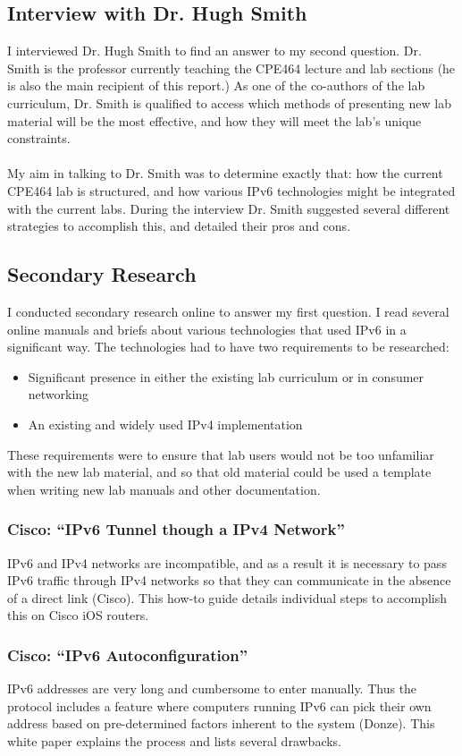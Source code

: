 \documentclass[12pt]{article}
\begin{document}
\subsection{Interview with Dr. Hugh Smith}
I interviewed Dr. Hugh Smith to find an answer to my second question. Dr. Smith is the professor currently teaching the CPE464 lecture and lab sections (he is also the main recipient of this report.) As one of the co-authors of the lab curriculum, Dr. Smith is qualified to access which methods of presenting new lab material will be the most effective, and how they will meet the lab's unique constraints.\\\\
 My aim in talking to Dr. Smith was to determine exactly that: how the current CPE464 lab is structured, and how various IPv6 technologies might be integrated with the current labs. During the interview Dr. Smith suggested several different strategies to accomplish this, and detailed their pros and cons.

\subsection{Secondary Research}
I conducted secondary research online to answer my first question. I read several online manuals and briefs about various technologies that used IPv6 in a significant way. The technologies had to have two requirements to be researched:
\begin{itemize}
\item Significant presence in either the existing lab curriculum or in consumer networking
\item An existing and widely used IPv4 implementation
\end{itemize}
These requirements were to ensure that lab users would not be too unfamiliar with the new lab material, and so that old material could be used a template when writing new lab manuals and other documentation.

\subsubsection{Cisco: ``IPv6 Tunnel though a IPv4 Network''}
IPv6 and IPv4 networks are incompatible, and as a result it is necessary to pass IPv6 traffic through IPv4 networks so that they can communicate in the absence of a direct link (Cisco). This how-to guide details individual steps to accomplish this on Cisco iOS routers.

\subsubsection{Cisco: ``IPv6 Autoconfiguration''}
IPv6 addresses are very long and cumbersome to enter manually. Thus the protocol includes a feature where computers running IPv6 can pick their own address based on pre-determined factors inherent to the system (Donze). This white paper explains the process and lists several drawbacks.
\end{document}
